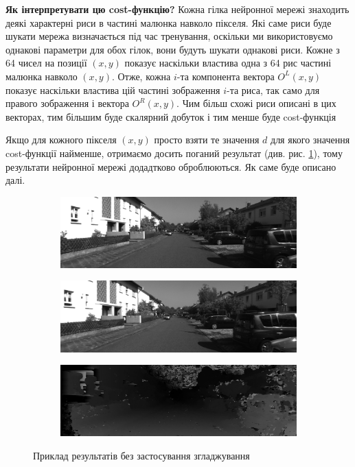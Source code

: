 \documentclass{article}
\theoremstyle{definition}
\begin{document}
\textbf{Як інтерпретувати цю cost-функцію?} Кожна гілка нейронної мережі знаходить деякі характерні риси в частині малюнка навколо пікселя. Які саме риси буде шукати мережа визначається під час тренування, оскільки ми використовуємо однакові параметри для обох гілок, вони будуть шукати однакові риси. Кожне з 64 чисел на позиції $(x, y)$ показує наскільки властива одна з 64 рис частині малюнка навколо $(x,y)$. Отже, кожна $i$-та компонента вектора $O^L(x,y)$ показує наскільки властива цій частині зображення $i$-та риса, так само для правого зображення і вектора $O^R(x,y)$. Чим більш схожі риси описані в цих векторах, тим більшим буде скалярний добуток і тим менше буде cost-функція

Якщо для кожного пікселя $(x,y)$ просто взяти те значення $d$ для якого значення cost-функції найменше, отримаємо досить поганий результат (див. рис. \ref{fig:bad_approach_example}), тому результати нейронної мережі додадтково оброблюються. Як саме буде описано далі.

 \begin{figure}[h]
 	\begin{subfigure}{\textwidth}
 		\includegraphics[width=\linewidth]{kitti_example_left}
 		\centering
 	\end{subfigure}
 	\begin{subfigure}{\textwidth}
 		\includegraphics[width=\linewidth]{kitti_example_right}
 		\centering
 	\end{subfigure}
	\begin{subfigure}{\textwidth}
		\includegraphics[width=\linewidth]{no_smoothing_result}
		\centering
	\end{subfigure}
 	\centering
 	\caption{Приклад результатів без застосування згладжування}
 	\label{fig:bad_approach_example}
 \end{figure}
\end{document}

